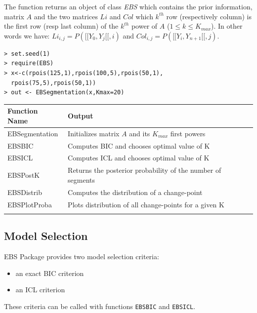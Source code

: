 \documentclass{bioinfo}
\begin{document}
\begin{methods}
The function returns an object of class \textit{EBS} which contains the prior information, matrix $A$ and the two matrices $Li$ and $Col$
 which $k^{th}$ row (respectively column) is the first row (resp last column) of the $k^{th}$ power of $A$ ($1\leq k \leq K_{max}$). 
In other words we have: $Li_{i,j}=P([\![Y_0,Y_j[\![,i)$ and $Col_{i,j}=P([\![Y_i,Y_{n+1}[\![,j)$.

\begin{verbatim}
> set.seed(1)
> require(EBS)
> x<-c(rpois(125,1),rpois(100,5),rpois(50,1),
  rpois(75,5),rpois(50,1))
> out <- EBSegmentation(x,Kmax=20)
\end{verbatim}


\begin{table}[!t]
{\begin{tabular}{ll}\toprule
Function Name & Output \\\midrule
 EBSegmentation & Initializes matrix $A$ and its $K_{max}$ first powers\\
 EBSBIC & Computes BIC and chooses optimal value of K \\
 EBSICL & Computes ICL and chooses optimal value of K \\
 EBSPostK & Returns the posterior probability of the number of segments\\
 EBSDistrib & Computes the distribution of a change-point\\
 EBSPlotProba & Plots distribution of all change-points for a given K\\\botrule
\end{tabular}}{}
\end{table}




\subsection{Model Selection}

EBS Package provides two model selection criteria:
\begin{itemize}
\item an exact BIC criterion
\item an ICL criterion
\end{itemize}


These criteria can be called with functions \texttt{EBSBIC} and \texttt{EBSICL}. 


\end{methods}
\end{document}
